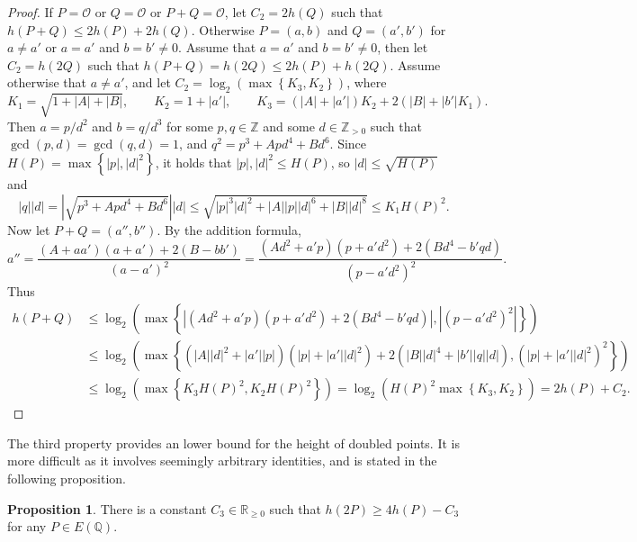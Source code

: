 \documentclass{article}
\newcommand{\Z}{\mathbb{Z}}
\newcommand{\Q}{\mathbb{Q}}
\newcommand{\R}{\mathbb{R}}
\newcommand{\rb}[1]{\left( #1 \right)}
\newcommand{\cb}[1]{\left\{ #1 \right\}}
\newcommand{\abs}[1]{\left\lvert #1 \right\rvert}
\theoremstyle{definition}
\newtheorem{proposition}{Proposition}[subsection]
\begin{document}
\begin{proof}
If $ P = \mathcal{O} $ or $ Q = \mathcal{O} $ or $ P + Q = \mathcal{O} $, let $ C_2 = 2h\rb{Q} $ such that $ h\rb{P + Q} \le 2h\rb{P} + 2h\rb{Q} $. Otherwise $ P = \rb{a, b} $ and $ Q = \rb{a', b'} $ for $ a \ne a' $ or $ a = a' $ and $ b = b' \ne 0 $. Assume that $ a = a' $ and $ b = b' \ne 0 $, then let $ C_2 = h\rb{2Q} $ such that $ h\rb{P + Q} = h\rb{2Q} \le 2h\rb{P} + h\rb{2Q} $. Assume otherwise that $ a \ne a' $, and let $ C_2 = \log_2\rb{\max\cb{K_3, K_2}} $, where
$$ K_1 = \sqrt{1 + \abs{A} + \abs{B}}, \qquad K_2 = 1 + \abs{a'}, \qquad K_3 = \rb{\abs{A} + \abs{a'}}K_2 + 2\rb{\abs{B} + \abs{b'}K_1}. $$
Then $ a = p / d^2 $ and $ b = q / d^3 $ for some $ p, q \in \Z $ and some $ d \in \Z_{> 0} $ such that $ \gcd\rb{p, d} = \gcd\rb{q, d} = 1 $, and $ q^2 = p^3 + Apd^4 + Bd^6 $. Since $ H\rb{P} = \max\cb{\abs{p}, \abs{d}^2} $, it holds that $ \abs{p}, \abs{d}^2 \le H\rb{P} $, so $ \abs{d} \le \sqrt{H\rb{P}} $ and
$$ \abs{q}\abs{d} = \abs{\sqrt{p^3 + Apd^4 + Bd^6}}\abs{d} \le \sqrt{\abs{p}^3\abs{d}^2 + \abs{A}\abs{p}\abs{d}^6 + \abs{B}\abs{d}^8} \le K_1H\rb{P}^2. $$
Now let $ P + Q = \rb{a'', b''} $. By the addition formula,
$$ a'' = \dfrac{\rb{A + aa'}\rb{a + a'} + 2\rb{B - bb'}}{\rb{a - a'}^2} = \dfrac{\rb{Ad^2 + a'p}\rb{p + a'd^2} + 2\rb{Bd^4 - b'qd}}{\rb{p - a'd^2}^2}. $$
Thus
\begin{align*}
h\rb{P + Q}
& \le \log_2\rb{\max\cb{\abs{\rb{Ad^2 + a'p}\rb{p + a'd^2} + 2\rb{Bd^4 - b'qd}}, \abs{\rb{p - a'd^2}^2}}} \\
& \le \log_2\rb{\max\cb{\rb{\abs{A}\abs{d}^2 + \abs{a'}\abs{p}}\rb{\abs{p} + \abs{a'}\abs{d}^2} + 2\rb{\abs{B}\abs{d}^4 + \abs{b'}\abs{q}\abs{d}}, \rb{\abs{p} + \abs{a'}\abs{d}^2}^2}} \\
& \le \log_2\rb{\max\cb{K_3H\rb{P}^2, K_2H\rb{P}^2}}
= \log_2\rb{H\rb{P}^2\max\cb{K_3, K_2}}
= 2h\rb{P} + C_2.
\end{align*}
\end{proof}

\pagebreak

The third property provides an lower bound for the height of doubled points. It is more difficult as it involves seemingly arbitrary identities, and is stated in the following proposition.

\begin{proposition}
\label{prop:lowerbound}
There is a constant $ C_3 \in \R_{\ge 0} $ such that $ h\rb{2P} \ge 4h\rb{P} - C_3 $ for any $ P \in E\rb{\Q} $.
\end{proposition}
\end{document}
